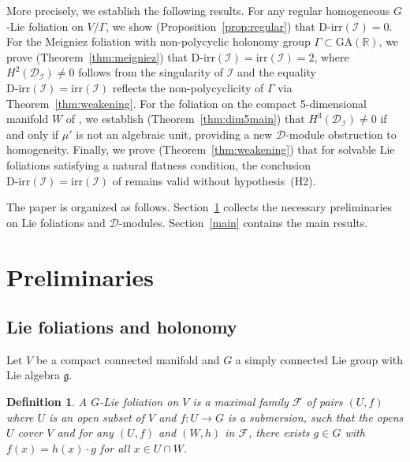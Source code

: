 \documentclass[12pt,a4paper]{article}
\newtheorem{definition}[theorem]{Definition}
\begin{document}
More precisely, we establish the following results. For any regular homogeneous
$G$-Lie foliation on $V/\Gamma$, we show (Proposition~\ref{prop:regular}) that
$\mathrm{D\text{-}irr}(\mathcal{I}) = 0$. For the Meigniez foliation
\cite{Me95} with non-polycyclic holonomy group
$\Gamma \subset \mathrm{GA}(\mathbb{R})$, we prove
(Theorem~\ref{thm:meigniez}) that
$\mathrm{D\text{-}irr}(\mathcal{I}) = \mathrm{irr}(\mathcal{I}) = 2$,
where $H^2(\mathcal{D}_{\mathcal{I}}) \neq 0$ follows from the singularity
of $\mathcal{I}$ and the equality
$\mathrm{D\text{-}irr}(\mathcal{I}) = \mathrm{irr}(\mathcal{I})$
reflects the non-polycyclicity of $\Gamma$ via
Theorem~\ref{thm:weakening}. For the foliation on the compact 5-dimensional
manifold $W$ of \cite{DN11}, we establish (Theorem~\ref{thm:dim5main}) that
$H^3(\mathcal{D}_{\mathcal{I}}) \neq 0$ if and only if $\mu'$ is not an
algebraic unit, providing a new $\mathcal{D}$-module obstruction to
homogeneity. Finally, we prove (Theorem~\ref{thm:weakening}) that for solvable
Lie foliations satisfying a natural flatness condition, the conclusion
$\mathrm{D\text{-}irr}(\mathcal{I}) = \mathrm{irr}(\mathcal{I})$ of
\cite{D16} remains valid without hypothesis~(H2).

The paper is organized as follows. Section~\ref{prelim} collects the necessary
preliminaries on Lie foliations and $\mathcal{D}$-modules.
Section~\ref{main} contains the main results.

\section{Preliminaries}\label{prelim}

\subsection{Lie foliations and holonomy}

Let $V$ be a compact connected manifold and $G$ a simply connected Lie group
with Lie algebra $\mathfrak{g}$.

\begin{definition}
A \emph{$G$-Lie foliation} on $V$ is a maximal family $\mathcal{F}$ of pairs
$(U, f)$ where $U$ is an open subset of $V$ and $f: U \to G$ is a submersion,
such that the opens $U$ cover $V$ and for any $(U,f)$ and $(W,h)$ in
$\mathcal{F}$, there exists $g \in G$ with $f(x) = h(x) \cdot g$ for all
$x \in U \cap W$.
\end{definition}
\end{document}
